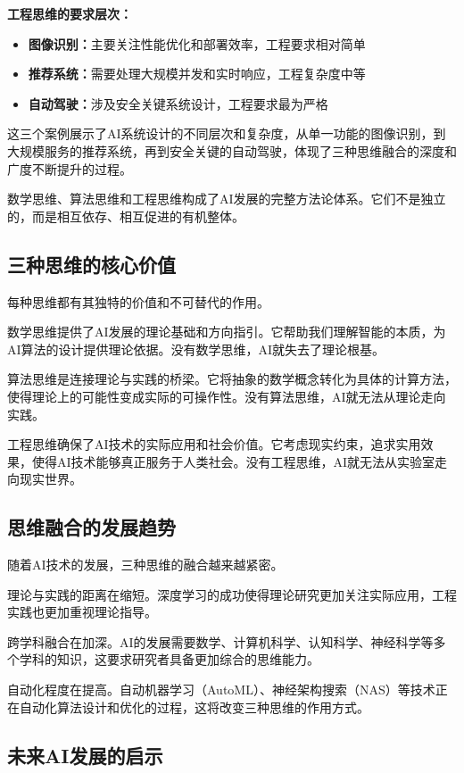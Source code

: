 \textbf{工程思维的要求层次：}
\begin{itemize}
\item \textbf{图像识别：}主要关注性能优化和部署效率，工程要求相对简单
\item \textbf{推荐系统：}需要处理大规模并发和实时响应，工程复杂度中等
\item \textbf{自动驾驶：}涉及安全关键系统设计，工程要求最为严格
\end{itemize}

这三个案例展示了AI系统设计的不同层次和复杂度，从单一功能的图像识别，到大规模服务的推荐系统，再到安全关键的自动驾驶，体现了三种思维融合的深度和广度不断提升的过程。

数学思维、算法思维和工程思维构成了AI发展的完整方法论体系。它们不是独立的，而是相互依存、相互促进的有机整体。

\subsection{三种思维的核心价值}

每种思维都有其独特的价值和不可替代的作用。

数学思维提供了AI发展的理论基础和方向指引。它帮助我们理解智能的本质，为AI算法的设计提供理论依据。没有数学思维，AI就失去了理论根基。

算法思维是连接理论与实践的桥梁。它将抽象的数学概念转化为具体的计算方法，使得理论上的可能性变成实际的可操作性。没有算法思维，AI就无法从理论走向实践。

工程思维确保了AI技术的实际应用和社会价值。它考虑现实约束，追求实用效果，使得AI技术能够真正服务于人类社会。没有工程思维，AI就无法从实验室走向现实世界。

\subsection{思维融合的发展趋势}

随着AI技术的发展，三种思维的融合越来越紧密。

理论与实践的距离在缩短。深度学习的成功使得理论研究更加关注实际应用，工程实践也更加重视理论指导。

跨学科融合在加深。AI的发展需要数学、计算机科学、认知科学、神经科学等多个学科的知识，这要求研究者具备更加综合的思维能力。

自动化程度在提高。自动机器学习（AutoML）、神经架构搜索（NAS）等技术正在自动化算法设计和优化的过程，这将改变三种思维的作用方式。

\subsection{未来AI发展的启示}

